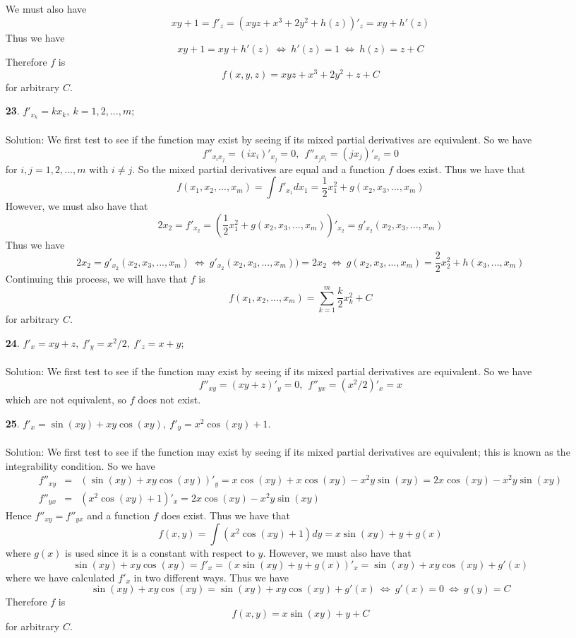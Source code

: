 \documentclass[12pt]{amsbook}
\begin{document}
\begin{enumerate}
We must also have
$$xy+1=f'_z=(xyz+x^3+2y^2+h(z))'_z=xy+h'(z)$$
Thus we have
$$xy+1=xy+h'(z) \ \Leftrightarrow \ h'(z)=1 \ \Leftrightarrow \ h(z)=z+C$$
Therefore $f$ is 
$$f(x,y,z)=xyz+x^3+2y^2+z+C$$
for arbitrary $C$. 
\\
\item[{\small\bf 23}.] $f'_{x_k}=kx_k ,\ k=1,2,...,m$;
\\
\\
{\sc Solution}: We first test to see if the function may exist by seeing if its mixed partial derivatives are equivalent. So we have
$$f''_{x_ix_j}=(ix_i)'_{x_j}=0, \ \ f''_{x_jx_i}=(jx_j)'_{x_i}=0$$
for $i,j=1,2,...,m$ with $i \neq j$. So the mixed partial derivatives are equal and a function $f$ does exist. Thus we have that
$$f(x_1,x_2,...,x_m)=\int f'_{x_1} d{x_1} = \frac{1}{2}x_1^2+g(x_2,x_3,...,x_m)$$
However, we must also have that
$$2x_2=f'_{x_2}=(\frac{1}{2}x_1^2+g(x_2,x_3,...,x_m))'_{x_2}=g'_{x_2}(x_2,x_3,...,x_m)$$
Thus we have
$$2x_2=g'_{x_2}(x_2,x_3,...,x_m) \ \Leftrightarrow \ g'_{x_2}(x_2,x_3,...,x_m))=2x_2 \ \Leftrightarrow \ g(x_2,x_3,...,x_m)=\frac{2}{2}x_2^2+h(x_3,...,x_m)$$
Continuing this process, we will have that $f$ is
$$f(x_1,x_2,...,x_m)=\sum_{k=1}^m\frac{k}{2}x_k^2+C$$
for arbitrary $C$. 
\\
\item[{\small\bf 24}.] $f'_x=xy+z ,\ f'_y=x^2/2 ,\ f'_z=x+y$;
\\
\\
{\sc Solution}: We first test to see if the function may exist by seeing if its mixed partial derivatives are equivalent. So we have
$$f''_{xy}=(xy+z)'_y=0, \ \ f''_{yx}=(x^2/2)'_x=x $$
which are not equivalent, so $f$ does not exist.
\\
\item[{\small\bf 25}.] $f'_x=\sin(xy)+xy\cos(xy) ,\ f'_y=x^2\cos(xy)+1$.
\\
\\
{\sc Solution}: We first test to see if the function may exist by seeing if its mixed partial derivatives are equivalent; this is known as the integrability condition. So we have
\begin{eqnarray*}
f''_{xy}&=&(\sin(xy)+xy\cos(xy))'_y=x\cos(xy)+x\cos(xy)-x^2y\sin(xy)=2x\cos(xy)-x^2y\sin(xy) \\ f''_{yx}&=&(x^2\cos(xy)+1)'_x=2x\cos(xy)-x^2y\sin(xy)
\end{eqnarray*}
Hence $f''_{xy}=f''_{yx}$ and a function $f$ does exist. Thus we have that
$$f(x,y)=\int (x^2\cos(xy)+1) dy = x\sin(xy)+y+g(x)$$
where $g(x)$ is used since it is a constant with respect to $y$. However, we must also have that
$$\sin(xy)+xy\cos(xy)=f'_x=(x\sin(xy)+y+g(x))'_x=\sin(xy)+xy\cos(xy)+g'(x)$$
where we have calculated $f'_x$ in two different ways. Thus we have
$$\sin(xy)+xy\cos(xy)=\sin(xy)+xy\cos(xy)+g'(x) \ \Leftrightarrow \ g'(x)=0 \ \Leftrightarrow \ g(y)=C$$
Therefore $f$ is 
$$f(x,y)=x\sin(xy)+y+C$$
for arbitrary $C$. 
\\
\end{enumerate}
\end{document}
